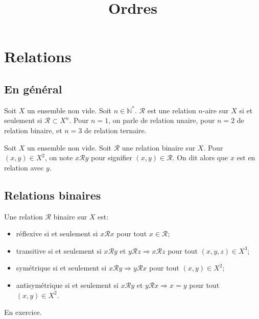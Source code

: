 \documentclass{scrartcl}
\title{Ordres}
\author{}
\date{}
\begin{document}
	\maketitle
	\section{Relations}
		\subsection{En général}
			\semidef Soit $X$ un ensemble non vide. Soit $n \in \mathbb{N}^*$.
			$\mathcal{R}$ est une relation $n$-aire sur $X$ si et seulement si $\mathcal{R} \subset{X}^n$.
			Pour $n=1$, on parle de relation unaire, pour $n=2$ de relation binaire, et $n=3$ de relation ternaire.

			\semidef Soit $X$ un ensemble non vide. Soit $\mathcal{R}$ une relation binaire sur $X$.
			Pour $(x,y) \in X^2$, on note $x\mathcal{R}y$ pour signifier $(x,y) \in \mathcal{R}$.
			On dit alors que $x$ est en relation avec $y$.

		\subsection{Relations binaires}
			\semidef Une relation $\mathcal{R}$ binaire sur $X$ est:
			\begin{itemize}
				\item réflexive si et seulement si $x \mathcal{R} x$ pour tout $x \in \mathcal{R}$;
				\item transitive si et seulement si $x \mathcal{R} y$ et $y \mathcal{R} z \Rightarrow x \mathcal{R} z$ pour tout $(x,y,z) \in X^3$;  
				\item symétrique si et seulement si $x \mathcal{R} y \Rightarrow y \mathcal{R} x$ pour tout $(x,y) \in X^2$;
				\item antisymétrique si et seulement si $x \mathcal{R} y$ et $y \mathcal{R} x \Rightarrow x = y$ pour tout $(x,y) \in X^2$. 
			\end{itemize}

			\begin{demo}
				\item En exercice.
			\end{demo}
\end{document}
